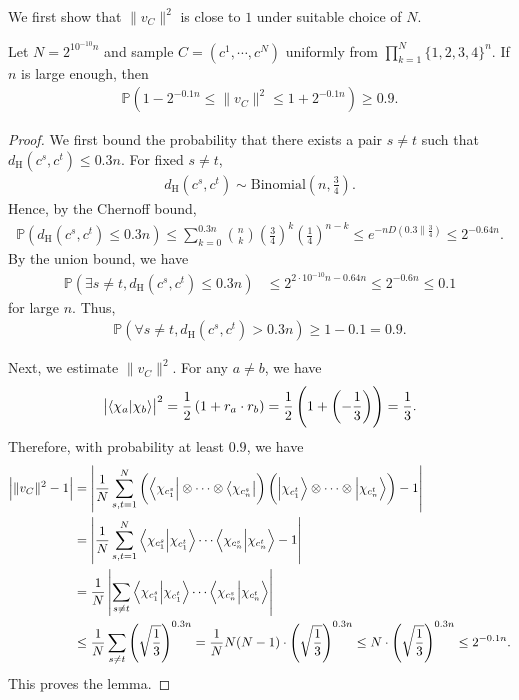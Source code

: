 We first show that $\|v_C\|^2$ is close to $1$ under suitable choice of $N$.

\begin{lemma}\label{lemma_19}
Let $N=2^{10^{-10}n}$ and sample $C=(c^1,\cdots,c^N)$ uniformly from $\prod_{k=1}^N\{1,2,3,4\}^n$.
If $n$ is large enough, then
\begin{align}\label{eq_202606131546}
\mathbb{P}\left(1-2^{-0.1n}\le\|v_C\|^2\le1+2^{-0.1n}\right)\ge0.9.
\end{align}
\end{lemma}
\begin{proof}
We first bound the probability that there exists a pair $s\neq t$ such that $d_{\text{H}}(c^s,c^t)\le0.3n$.
For fixed $s\neq t$,
\begin{align*}
d_{\text{H}}(c^s,c^t)\sim\mathrm{Binomial}\left(n,\frac{3}{4}\right).
\end{align*}
Hence, by the Chernoff bound,
\begin{align}\label{eq_202606111146}
\mathbb{P}\left(d_{\text{H}}(c^s,c^t)\le 0.3n\right)\le\sum_{k=0}^{0.3n}\binom{n}{k}\left(\frac{3}{4}\right)^{k}\left(\frac{1}{4}\right)^{n-k}\le e^{-nD(0.3\|\frac{3}{4})}\le2^{-0.64n}.
\end{align}
By the union bound, we have
\begin{align*}
\mathbb{P}\left(\exists s\neq t, d_{\text{H}}(c^s,c^t)\le 0.3n\right)&\le2^{2\cdot10^{-10}n-0.64n}\le2^{-0.6n}\le0.1
\end{align*}
for large $n$.
Thus,
\begin{align*}
\mathbb{P}\left(\forall s\neq t,d_{\text{H}}(c^s,c^t)> 0.3n\right)\ge1-0.1=0.9.
\end{align*}

Next, we estimate $\|v_C\|^2$.
For any $a\neq b$, we have
\begin{align*}
\left|\bra{\chi_{a}}\ket{\chi_{b}}\right|^2=\frac{1}{2}\left(1+r_a\cdot r_b\right)=\frac{1}{2}\left(1+\left(-\frac{1}{3}\right)\right)=\frac{1}{3}.
\end{align*}
Therefore, with probability at least $0.9$, we have
\begin{align*}
\left|\|v_C\|^2-1\right|
&=\left|\frac{1}{N}\sum_{s,t=1}^N\left(\bra{\chi_{c^s_1}}\otimes\cdots\otimes\bra{\chi_{c^s_n}}\right)\left(\ket{\chi_{c^t_1}}\otimes\cdots\otimes\ket{\chi_{c^t_n}}\right)-1\right|\\
&=\left|\frac{1}{N}\sum_{s,t=1}^N\bra{\chi_{c^s_1}}\ket{\chi_{c^t_1}}\cdots\bra{\chi_{c^s_n}}\ket{\chi_{c^t_n}}-1\right|\\
&=\frac{1}{N}\left|\sum_{s\neq t}\bra{\chi_{c^s_1}}\ket{\chi_{c^t_1}}\cdots\bra{\chi_{c^s_n}}\ket{\chi_{c^t_n}}\right|\\
&\le\frac{1}{N}\sum_{s\neq t}\left(\sqrt{\frac{1}{3}}\right)^{0.3n}=\frac{1}{N}N(N-1)\cdot\left(\sqrt{\frac{1}{3}}\right)^{0.3n}
\le N\cdot\left(\sqrt{\frac{1}{3}}\right)^{0.3n}\le2^{-0.1n}.
\end{align*}
This proves the lemma.
\end{proof}

